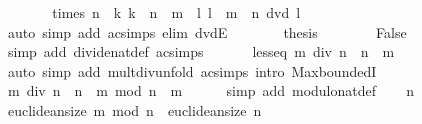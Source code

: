 \begin{isabellebody}
\ \ \ \ \isamarkupfalse%
\ \isamarkupfalse%
\ {\isachardoublequoteopen}times\ n\ {\isacharbackquote}{\kern0pt}\ {\isacharbraceleft}{\kern0pt}k{\isachardot}{\kern0pt}\ k\ {\isacharasterisk}{\kern0pt}\ n\ {\isasymle}\ m{\isacharbraceright}{\kern0pt}\ {\isacharequal}{\kern0pt}\ {\isacharbraceleft}{\kern0pt}l{\isachardot}{\kern0pt}\ l\ {\isasymle}\ m\ {\isasymand}\ n\ dvd\ l{\isacharbraceright}{\kern0pt}{\isachardoublequoteclose}\isanewline
\ \ \ \ \ \ \isamarkupfalse%
\ {\isacharparenleft}{\kern0pt}auto\ simp\ add{\isacharcolon}{\kern0pt}\ ac{\isacharunderscore}{\kern0pt}simps\ elim{\isacharbang}{\kern0pt}{\isacharcolon}{\kern0pt}\ dvdE{\isacharparenright}{\kern0pt}\isanewline
\ \ \ \ \isamarkupfalse%
\ \isamarkupfalse%
\ {\isacharquery}{\kern0pt}thesis\isanewline
\ \ \ \ \ \ \isamarkupfalse%
\ False\ \isamarkupfalse%
\ {\isacharparenleft}{\kern0pt}simp\ add{\isacharcolon}{\kern0pt}\ divide{\isacharunderscore}{\kern0pt}nat{\isacharunderscore}{\kern0pt}def\ ac{\isacharunderscore}{\kern0pt}simps{\isacharparenright}{\kern0pt}\isanewline
\ \ \isamarkupfalse%
\isanewline
\ \ \isamarkupfalse%
\ less{\isacharunderscore}{\kern0pt}eq{\isacharcolon}{\kern0pt}\ {\isachardoublequoteopen}m\ div\ n\ {\isacharasterisk}{\kern0pt}\ n\ {\isasymle}\ m{\isachardoublequoteclose}\isanewline
\ \ \ \ \isamarkupfalse%
\ {\isacharparenleft}{\kern0pt}auto\ simp\ add{\isacharcolon}{\kern0pt}\ mult{\isacharunderscore}{\kern0pt}div{\isacharunderscore}{\kern0pt}unfold\ ac{\isacharunderscore}{\kern0pt}simps\ intro{\isacharcolon}{\kern0pt}\ Max{\isachardot}{\kern0pt}boundedI{\isacharparenright}{\kern0pt}\isanewline
\ \ \isamarkupfalse%
\ \isamarkupfalse%
\ {\isachardoublequoteopen}m\ div\ n\ {\isacharasterisk}{\kern0pt}\ n\ {\isacharplus}{\kern0pt}\ m\ mod\ n\ {\isacharequal}{\kern0pt}\ m{\isachardoublequoteclose}\isanewline
\ \ \ \ \isamarkupfalse%
\ {\isacharparenleft}{\kern0pt}simp\ add{\isacharcolon}{\kern0pt}\ modulo{\isacharunderscore}{\kern0pt}nat{\isacharunderscore}{\kern0pt}def{\isacharparenright}{\kern0pt}\isanewline
\ \ \isamarkupfalse%
\ {\isachardoublequoteopen}n\ {\isasymnoteq}\ {}{\isachardoublequoteclose}\ \isanewline
\ \ \isamarkupfalse%
\ {\isachardoublequoteopen}euclidean{\isacharunderscore}{\kern0pt}size\ {\isacharparenleft}{\kern0pt}m\ mod\ n{\isacharparenright}{\kern0pt}\ {\isacharless}{\kern0pt}\ euclidean{\isacharunderscore}{\kern0pt}size\ n{\isachardoublequoteclose}\isanewline

\end{isabellebody}
